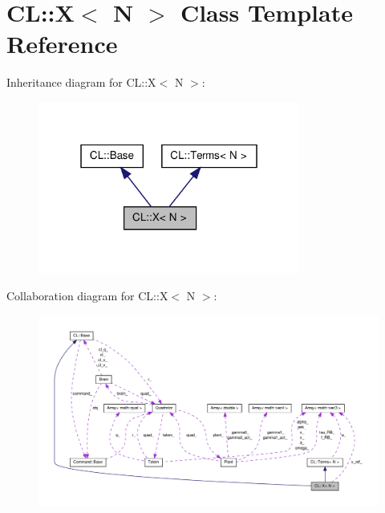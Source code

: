 \hypertarget{classCL_1_1X}{\section{\-C\-L\-:\-:\-X$<$ \-N $>$ \-Class \-Template \-Reference}
\label{classCL_1_1X}
}


\-Inheritance diagram for \-C\-L\-:\-:\-X$<$ \-N $>$\-:\nopagebreak
\begin{figure}[H]
\begin{center}
\leavevmode
\includegraphics[width=244pt]{classCL_1_1X__inherit__graph}
\end{center}
\end{figure}


\-Collaboration diagram for \-C\-L\-:\-:\-X$<$ \-N $>$\-:\nopagebreak
\begin{figure}[H]
\begin{center}
\leavevmode
\includegraphics[width=350pt]{classCL_1_1X__coll__graph}
\end{center}
\end{figure}
